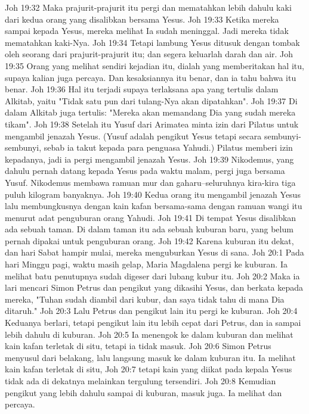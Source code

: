 Joh 19:32  Maka prajurit-prajurit itu pergi dan mematahkan lebih dahulu kaki dari kedua orang yang disalibkan bersama Yesus.
Joh 19:33  Ketika mereka sampai kepada Yesus, mereka melihat Ia sudah meninggal. Jadi mereka tidak mematahkan kaki-Nya.
Joh 19:34  Tetapi lambung Yesus ditusuk dengan tombak oleh seorang dari prajurit-prajurit itu; dan segera keluarlah darah dan air.
Joh 19:35  Orang yang melihat sendiri kejadian itu, dialah yang memberitakan hal itu, supaya kalian juga percaya. Dan kesaksiannya itu benar, dan ia tahu bahwa itu benar.
Joh 19:36  Hal itu terjadi supaya terlaksana apa yang tertulis dalam Alkitab, yaitu "Tidak satu pun dari tulang-Nya akan dipatahkan".
Joh 19:37  Di dalam Alkitab juga tertulis: "Mereka akan memandang Dia yang sudah mereka tikam".
Joh 19:38  Setelah itu Yusuf dari Arimatea minta izin dari Pilatus untuk mengambil jenazah Yesus. (Yusuf adalah pengikut Yesus tetapi secara sembunyi-sembunyi, sebab ia takut kepada para penguasa Yahudi.) Pilatus memberi izin kepadanya, jadi ia pergi mengambil jenazah Yesus.
Joh 19:39  Nikodemus, yang dahulu pernah datang kepada Yesus pada waktu malam, pergi juga bersama Yusuf. Nikodemus membawa ramuan mur dan gaharu--seluruhnya kira-kira tiga puluh kilogram banyaknya.
Joh 19:40  Kedua orang itu mengambil jenazah Yesus lalu membungkusnya dengan kain kafan bersama-sama dengan ramuan wangi itu menurut adat penguburan orang Yahudi.
Joh 19:41  Di tempat Yesus disalibkan ada sebuah taman. Di dalam taman itu ada sebuah kuburan baru, yang belum pernah dipakai untuk penguburan orang.
Joh 19:42  Karena kuburan itu dekat, dan hari Sabat hampir mulai, mereka menguburkan Yesus di sana.
Joh 20:1  Pada hari Minggu pagi, waktu masih gelap, Maria Magdalena pergi ke kuburan. Ia melihat batu penutupnya sudah digeser dari lubang kubur itu.
Joh 20:2  Maka ia lari mencari Simon Petrus dan pengikut yang dikasihi Yesus, dan berkata kepada mereka, "Tuhan sudah diambil dari kubur, dan saya tidak tahu di mana Dia ditaruh."
Joh 20:3  Lalu Petrus dan pengikut lain itu pergi ke kuburan.
Joh 20:4  Keduanya berlari, tetapi pengikut lain itu lebih cepat dari Petrus, dan ia sampai lebih dahulu di kuburan.
Joh 20:5  Ia menengok ke dalam kuburan dan melihat kain kafan terletak di situ, tetapi ia tidak masuk.
Joh 20:6  Simon Petrus menyusul dari belakang, lalu langsung masuk ke dalam kuburan itu. Ia melihat kain kafan terletak di situ,
Joh 20:7  tetapi kain yang diikat pada kepala Yesus tidak ada di dekatnya melainkan tergulung tersendiri.
Joh 20:8  Kemudian pengikut yang lebih dahulu sampai di kuburan, masuk juga. Ia melihat dan percaya.
